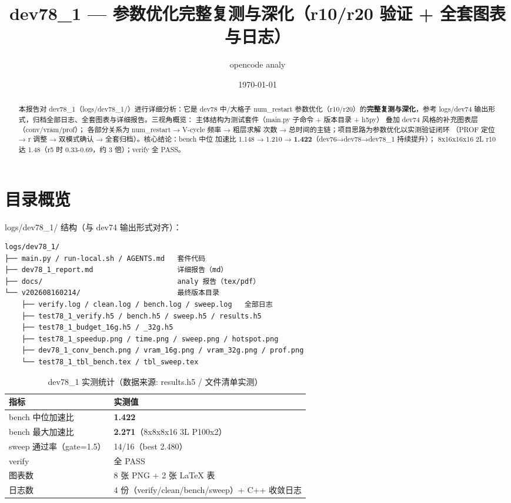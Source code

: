 \documentclass[UTF8]{ctexart}
\title{dev78\_1 --- 参数优化完整复测与深化（r10/r20 验证 + 全套图表与日志）}
\author{opencode analy}
\date{\today}
\begin{document}
\maketitle

\begin{abstract}
本报告对 dev78\_1（logs/dev78\_1/）进行详细分析：它是 dev78 中/大格子
num\_restart 参数优化（r10/r20）的\textbf{完整复测与深化}，参考 logs/dev74
输出形式，归档全部日志、全套图表与详细报告。三视角概览：
\textcolor{struct}{主体结构}为测试套件（main.py 子命令 + 版本目录 + h5py）
叠加 dev74 风格的补充图表层（conv/vram/prof）；
\textcolor{relation}{各部分关系}为 num\_restart → V-cycle 频率 → 粗层求解
次数 → 总时间的主链；\textcolor{idea}{项目思路}为参数优化以实测验证闭环
（PROF 定位 → r 调整 → 双模式确认 → 全套归档）。核心结论：bench 中位
加速比 1.148 → 1.210 → \textbf{1.422}（dev76→dev78→dev78\_1 持续提升）；
8x16x16x16 2L r10 达 1.48（r5 时 0.33-0.69，约 3 倍）；verify 全 PASS。
\end{abstract}

\tableofcontents

\section{目录概览}
logs/dev78\_1/ 结构（与 dev74 输出形式对齐）：
\begin{lstlisting}[language=bash]
logs/dev78_1/
├── main.py / run-local.sh / AGENTS.md   套件代码
├── dev78_1_report.md                    详细报告（md）
├── docs/                                analy 报告（tex/pdf）
└── v202608160214/                       最终版本目录
    ├── verify.log / clean.log / bench.log / sweep.log   全部日志
    ├── test78_1_verify.h5 / bench.h5 / sweep.h5 / results.h5
    ├── test78_1_budget_16g.h5 / _32g.h5
    ├── test78_1_speedup.png / time.png / sweep.png / hotspot.png
    ├── dev78_1_conv_bench.png / vram_16g.png / vram_32g.png / prof.png
    └── test78_1_tbl_bench.tex / tbl_sweep.tex
\end{lstlisting}

\begin{table}[htbp]\centering
\begin{tabular}{ll}
\toprule
指标 & 实测值 \\
\midrule
bench 中位加速比 & \textbf{1.422} \\
bench 最大加速比 & \textbf{2.271}（8x8x8x16 3L P100x2） \\
sweep 通过率（gate=1.5） & 14/16（best 2.480） \\
verify & 全 PASS \\
图表数 & 8 张 PNG + 2 张 LaTeX 表 \\
日志数 & 4 份（verify/clean/bench/sweep）+ C++ 收敛日志 \\
\bottomrule
\end{tabular}
\caption{dev78\_1 实测统计（数据来源: results.h5 / 文件清单实测）}
\end{table}
\end{document}
